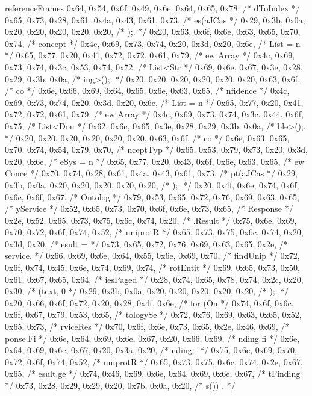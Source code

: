 \begin{chunk}{referenceFrames}
{{{{{0x64, 0x54, 0x6f, 0x49, 0x6e, 0x64, 0x65, 0x78, /* dToIndex */
0x65, 0x73, 0x28, 0x61, 0x4a, 0x43, 0x61, 0x73, /* es(aJCas */
0x29, 0x3b, 0x0a, 0x20, 0x20, 0x20, 0x20, 0x20, /* );.      */
0x20, 0x63, 0x6f, 0x6e, 0x63, 0x65, 0x70, 0x74, /*  concept */
0x4c, 0x69, 0x73, 0x74, 0x20, 0x3d, 0x20, 0x6e, /* List = n */
0x65, 0x77, 0x20, 0x41, 0x72, 0x72, 0x61, 0x79, /* ew Array */
0x4c, 0x69, 0x73, 0x74, 0x3c, 0x53, 0x74, 0x72, /* List<Str */
0x69, 0x6e, 0x67, 0x3e, 0x28, 0x29, 0x3b, 0x0a, /* ing>();. */
0x20, 0x20, 0x20, 0x20, 0x20, 0x20, 0x63, 0x6f, /*       co */
0x6e, 0x66, 0x69, 0x64, 0x65, 0x6e, 0x63, 0x65, /* nfidence */
0x4c, 0x69, 0x73, 0x74, 0x20, 0x3d, 0x20, 0x6e, /* List = n */
0x65, 0x77, 0x20, 0x41, 0x72, 0x72, 0x61, 0x79, /* ew Array */
0x4c, 0x69, 0x73, 0x74, 0x3c, 0x44, 0x6f, 0x75, /* List<Dou */
0x62, 0x6c, 0x65, 0x3e, 0x28, 0x29, 0x3b, 0x0a, /* ble>();. */
0x20, 0x20, 0x20, 0x20, 0x20, 0x20, 0x63, 0x6f, /*       co */
0x6e, 0x63, 0x65, 0x70, 0x74, 0x54, 0x79, 0x70, /* nceptTyp */
0x65, 0x53, 0x79, 0x73, 0x20, 0x3d, 0x20, 0x6e, /* eSys = n */
0x65, 0x77, 0x20, 0x43, 0x6f, 0x6e, 0x63, 0x65, /* ew Conce */
0x70, 0x74, 0x28, 0x61, 0x4a, 0x43, 0x61, 0x73, /* pt(aJCas */
0x29, 0x3b, 0x0a, 0x20, 0x20, 0x20, 0x20, 0x20, /* );.      */
0x20, 0x4f, 0x6e, 0x74, 0x6f, 0x6c, 0x6f, 0x67, /*  Ontolog */
0x79, 0x53, 0x65, 0x72, 0x76, 0x69, 0x63, 0x65, /* yService */
0x52, 0x65, 0x73, 0x70, 0x6f, 0x6e, 0x73, 0x65, /* Response */
0x2e, 0x52, 0x65, 0x73, 0x75, 0x6c, 0x74, 0x20, /* .Result  */
0x75, 0x6e, 0x69, 0x70, 0x72, 0x6f, 0x74, 0x52, /* uniprotR */
0x65, 0x73, 0x75, 0x6c, 0x74, 0x20, 0x3d, 0x20, /* esult =  */
0x73, 0x65, 0x72, 0x76, 0x69, 0x63, 0x65, 0x2e, /* service. */
0x66, 0x69, 0x6e, 0x64, 0x55, 0x6e, 0x69, 0x70, /* findUnip */
0x72, 0x6f, 0x74, 0x45, 0x6e, 0x74, 0x69, 0x74, /* rotEntit */
0x69, 0x65, 0x73, 0x50, 0x61, 0x67, 0x65, 0x64, /* iesPaged */
0x28, 0x74, 0x65, 0x78, 0x74, 0x2c, 0x20, 0x30, /* (text, 0 */
0x29, 0x3b, 0x0a, 0x20, 0x20, 0x20, 0x20, 0x20, /* );.      */
0x20, 0x66, 0x6f, 0x72, 0x20, 0x28, 0x4f, 0x6e, /*  for (On */
0x74, 0x6f, 0x6c, 0x6f, 0x67, 0x79, 0x53, 0x65, /* tologySe */
0x72, 0x76, 0x69, 0x63, 0x65, 0x52, 0x65, 0x73, /* rviceRes */
0x70, 0x6f, 0x6e, 0x73, 0x65, 0x2e, 0x46, 0x69, /* ponse.Fi */
0x6e, 0x64, 0x69, 0x6e, 0x67, 0x20, 0x66, 0x69, /* nding fi */
0x6e, 0x64, 0x69, 0x6e, 0x67, 0x20, 0x3a, 0x20, /* nding :  */
0x75, 0x6e, 0x69, 0x70, 0x72, 0x6f, 0x74, 0x52, /* uniprotR */
0x65, 0x73, 0x75, 0x6c, 0x74, 0x2e, 0x67, 0x65, /* esult.ge */
0x74, 0x46, 0x69, 0x6e, 0x64, 0x69, 0x6e, 0x67, /* tFinding */
0x73, 0x28, 0x29, 0x29, 0x20, 0x7b, 0x0a, 0x20, /* s()) {.  */
}}}}}}
\end{chunk}
